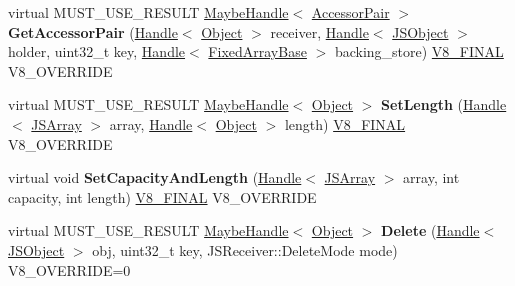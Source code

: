 \begin{DoxyCompactItemize}
\item 
\hypertarget{classv8_1_1internal_1_1_elements_accessor_base_a012b1308512fd6c5b33b668361619f7a}{}virtual M\+U\+S\+T\+\_\+\+U\+S\+E\+\_\+\+R\+E\+S\+U\+L\+T \hyperlink{classv8_1_1internal_1_1_maybe_handle}{Maybe\+Handle}$<$ \hyperlink{classv8_1_1internal_1_1_accessor_pair}{Accessor\+Pair} $>$ {\bfseries Get\+Accessor\+Pair} (\hyperlink{classv8_1_1internal_1_1_handle}{Handle}$<$ \hyperlink{classv8_1_1internal_1_1_object}{Object} $>$ receiver, \hyperlink{classv8_1_1internal_1_1_handle}{Handle}$<$ \hyperlink{classv8_1_1internal_1_1_j_s_object}{J\+S\+Object} $>$ holder, uint32\+\_\+t key, \hyperlink{classv8_1_1internal_1_1_handle}{Handle}$<$ \hyperlink{classv8_1_1internal_1_1_fixed_array_base}{Fixed\+Array\+Base} $>$ backing\+\_\+store) \hyperlink{classv8_1_1internal_1_1_v8___f_i_n_a_l}{V8\+\_\+\+F\+I\+N\+A\+L} V8\+\_\+\+O\+V\+E\+R\+R\+I\+D\+E\label{classv8_1_1internal_1_1_elements_accessor_base_a012b1308512fd6c5b33b668361619f7a}

\item 
\hypertarget{classv8_1_1internal_1_1_elements_accessor_base_a8d565c3d7cd4f8a6e5b2713cbfef5928}{}virtual M\+U\+S\+T\+\_\+\+U\+S\+E\+\_\+\+R\+E\+S\+U\+L\+T \hyperlink{classv8_1_1internal_1_1_maybe_handle}{Maybe\+Handle}$<$ \hyperlink{classv8_1_1internal_1_1_object}{Object} $>$ {\bfseries Set\+Length} (\hyperlink{classv8_1_1internal_1_1_handle}{Handle}$<$ \hyperlink{classv8_1_1internal_1_1_j_s_array}{J\+S\+Array} $>$ array, \hyperlink{classv8_1_1internal_1_1_handle}{Handle}$<$ \hyperlink{classv8_1_1internal_1_1_object}{Object} $>$ length) \hyperlink{classv8_1_1internal_1_1_v8___f_i_n_a_l}{V8\+\_\+\+F\+I\+N\+A\+L} V8\+\_\+\+O\+V\+E\+R\+R\+I\+D\+E\label{classv8_1_1internal_1_1_elements_accessor_base_a8d565c3d7cd4f8a6e5b2713cbfef5928}

\item 
\hypertarget{classv8_1_1internal_1_1_elements_accessor_base_a8712f3c0ae8dcbf2bad4ab42abc5f76c}{}virtual void {\bfseries Set\+Capacity\+And\+Length} (\hyperlink{classv8_1_1internal_1_1_handle}{Handle}$<$ \hyperlink{classv8_1_1internal_1_1_j_s_array}{J\+S\+Array} $>$ array, int capacity, int length) \hyperlink{classv8_1_1internal_1_1_v8___f_i_n_a_l}{V8\+\_\+\+F\+I\+N\+A\+L} V8\+\_\+\+O\+V\+E\+R\+R\+I\+D\+E\label{classv8_1_1internal_1_1_elements_accessor_base_a8712f3c0ae8dcbf2bad4ab42abc5f76c}

\item 
\hypertarget{classv8_1_1internal_1_1_elements_accessor_base_a1fdc525e8e9738f231386e5bf1be5a4c}{}virtual M\+U\+S\+T\+\_\+\+U\+S\+E\+\_\+\+R\+E\+S\+U\+L\+T \hyperlink{classv8_1_1internal_1_1_maybe_handle}{Maybe\+Handle}$<$ \hyperlink{classv8_1_1internal_1_1_object}{Object} $>$ {\bfseries Delete} (\hyperlink{classv8_1_1internal_1_1_handle}{Handle}$<$ \hyperlink{classv8_1_1internal_1_1_j_s_object}{J\+S\+Object} $>$ obj, uint32\+\_\+t key, J\+S\+Receiver\+::\+Delete\+Mode mode) V8\+\_\+\+O\+V\+E\+R\+R\+I\+D\+E=0\label{classv8_1_1internal_1_1_elements_accessor_base_a1fdc525e8e9738f231386e5bf1be5a4c}


\end{DoxyCompactItemize}
